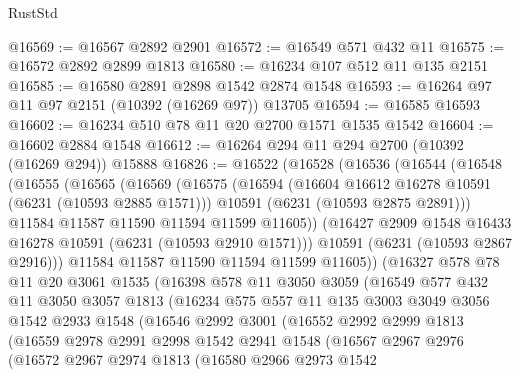 \begin{lexlean}{RustStd}
\begin{coremodule}
{{@16569 := @16567 @2892 @2901
@16572 := @16549 @571 @432 @11
@16575 := @16572 @2892 @2899 @1813
@16580 := @16234 @107 @512 @11 @135 @2151
@16585 := @16580 @2891 @2898 @1542 @2874 @1548
@16593 := @16264 @97 @11 @97 @2151 (@10392 (@16269 @97)) @13705
@16594 := @16585 @16593
@16602 := @16234 @510 @78 @11 @20 @2700 @1571 @1535 @1542
@16604 := @16602 @2884 @1548
@16612 := @16264 @294 @11 @294 @2700 (@10392 (@16269 @294)) @15888
@16826 := @16522
    (@16528
      (@16536
        (@16544
          (@16548
            (@16555
              (@16565
                (@16569
                  (@16575
                    (@16594
                      (@16604 @16612 @16278 @10591 (@6231 (@10593 @2885 @1571)))
                      @10591
                      (@6231 (@10593 @2875 @2891)))
                    @11584
                    @11587
                    @11590
                    @11594
                    @11599
                    @11605))
                (@16427 @2909 @1548 @16433 @16278 @10591 (@6231 (@10593 @2910 @1571)))
                @10591
                (@6231 (@10593 @2867 @2916)))
              @11584
              @11587
              @11590
              @11594
              @11599
              @11605))
          (@16327
            @578
            @78
            @11
            @20
            @3061
            @1535
            (@16398
              @578
              @11
              @3050
              @3059
              (@16549
                @577
                @432
                @11
                @3050
                @3057
                @1813
                (@16234
                  @575
                  @557
                  @11
                  @135
                  @3003
                  @3049
                  @3056
                  @1542
                  @2933
                  @1548
                  (@16546
                    @2992
                    @3001
                    (@16552
                      @2992
                      @2999
                      @1813
                      (@16559
                        @2978
                        @2991
                        @2998
                        @1542
                        @2941
                        @1548
                        (@16567
                          @2967
                          @2976
                          (@16572
                            @2967
                            @2974
                            @1813
                            (@16580
                              @2966
                              @2973
                              @1542
}}
\end{coremodule}
\end{lexlean}
